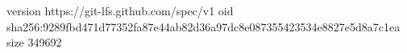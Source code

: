 version https://git-lfs.github.com/spec/v1
oid sha256:9289fbd471d77352fa87e44ab82d36a97dc8e087355423534e8827e5d8a7c1ea
size 349692
